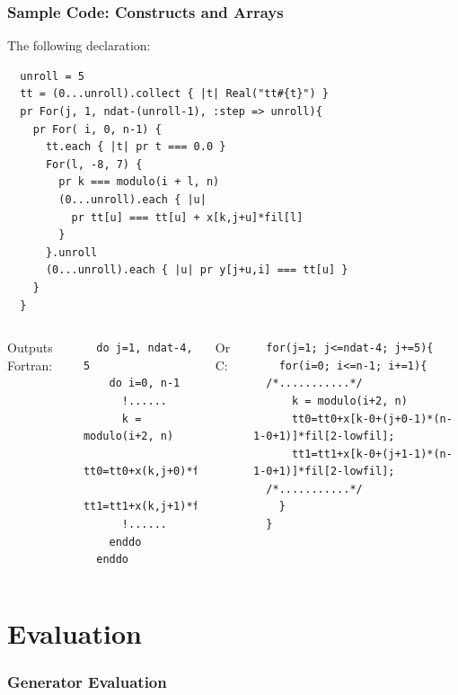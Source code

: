 \documentclass{beamer}
\begin{document}
\begin{frame}[fragile]
\frametitle{Sample Code: Constructs and Arrays}
The following declaration:
\tiny
\lstset{style=BOAST}
\begin{lstlisting}
  unroll = 5
  tt = (0...unroll).collect { |t| Real("tt#{t}") }
  pr For(j, 1, ndat-(unroll-1), :step => unroll){
    pr For( i, 0, n-1) {
      tt.each { |t| pr t === 0.0 }
      For(l, -8, 7) {
        pr k === modulo(i + l, n)
        (0...unroll).each { |u|
          pr tt[u] === tt[u] + x[k,j+u]*fil[l]
        }
      }.unroll
      (0...unroll).each { |u| pr y[j+u,i] === tt[u] }
    }
  }
\end{lstlisting}
\begin{columns}

\normalsize 
Outputs Fortran:
\tiny
\lstset{style=Fortran}
\begin{lstlisting}
  do j=1, ndat-4, 5
    do i=0, n-1
      !......
      k = modulo(i+2, n)
      tt0=tt0+x(k,j+0)*fil(2)
      tt1=tt1+x(k,j+1)*fil(2)
      !......
    enddo
  enddo
\end{lstlisting}
\normalsize
Or C:
\tiny
\lstset{style=C}
\begin{lstlisting}
  for(j=1; j<=ndat-4; j+=5){
    for(i=0; i<=n-1; i+=1){
  /*...........*/
      k = modulo(i+2, n)
      tt0=tt0+x[k-0+(j+0-1)*(n-1-0+1)]*fil[2-lowfil];
      tt1=tt1+x[k-0+(j+1-1)*(n-1-0+1)]*fil[2-lowfil];
  /*...........*/
    }
  }
\end{lstlisting}
\end{columns}
\end{frame}

\section{Evaluation}
\begin{frame}
\frametitle{Generator Evaluation}

\end{frame}
\end{document}
